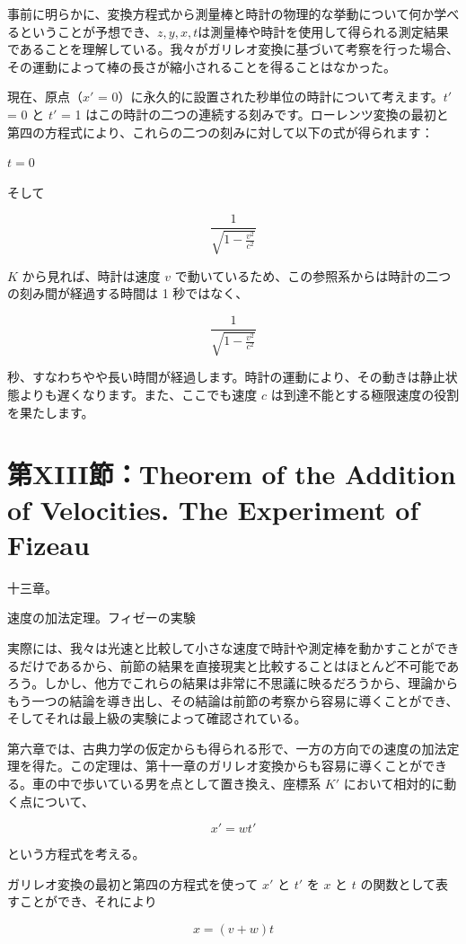 \documentclass[a4paper,11pt,openany]{ltjsbook}
\begin{document}
事前に明らかに、変換方程式から測量棒と時計の物理的な挙動について何か学べるということが予想でき、$z, y, x, t$は測量棒や時計を使用して得られる測定結果であることを理解している。我々がガリレオ変換に基づいて考察を行った場合、その運動によって棒の長さが縮小されることを得ることはなかった。

現在、原点（$x′$ = 0）に永久的に設置された秒単位の時計について考えます。$t′$ = 0 と $t′$ = 1 はこの時計の二つの連続する刻みです。ローレンツ変換の最初と第四の方程式により、これらの二つの刻みに対して以下の式が得られます：

$t = 0$

そして

\[
\frac{1}{\sqrt{1 - \frac{v^2}{c^2}}}
\]


$K$ から見れば、時計は速度 $v$ で動いているため、この参照系からは時計の二つの刻み間が経過する時間は 1 秒ではなく、

\[
\frac{1}{\sqrt{1 - \frac{v^2}{c^2}}}
\]


秒、すなわちやや長い時間が経過します。時計の運動により、その動きは静止状態よりも遅くなります。また、ここでも速度 $c$ は到達不能とする極限速度の役割を果たします。


\clearpage
\chapter{第XIII節：Theorem of the Addition of Velocities. The Experiment of Fizeau}

十三章。

速度の加法定理。フィゼーの実験

実際には、我々は光速と比較して小さな速度で時計や測定棒を動かすことができるだけであるから、前節の結果を直接現実と比較することはほとんど不可能であろう。しかし、他方でこれらの結果は非常に不思議に映るだろうから、理論からもう一つの結論を導き出し、その結論は前節の考察から容易に導くことができ、そしてそれは最上級の実験によって確認されている。

第六章では、古典力学の仮定からも得られる形で、一方の方向での速度の加法定理を得た。この定理は、第十一章のガリレオ変換からも容易に導くことができる。車の中で歩いている男を点として置き換え、座標系 \( K' \) において相対的に動く点について、

\[ x' = wt' \]

という方程式を考える。

ガリレオ変換の最初と第四の方程式を使って \( x' \) と \( t' \) を \( x \) と \( t \) の関数として表すことができ、それにより

\[ x = (v + w)t \]
\end{document}
